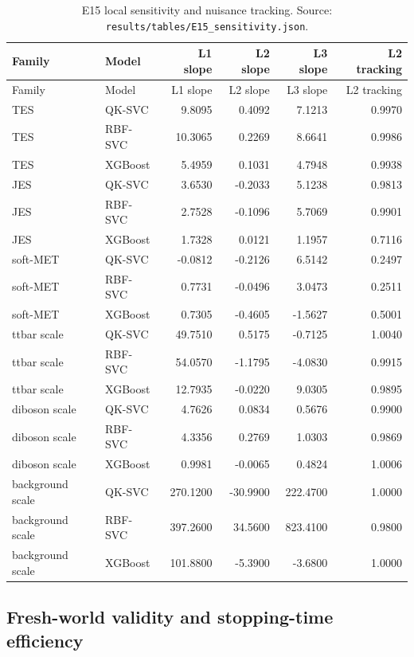 \documentclass[11pt,a4paper]{article}
\begin{document}
\footnotesize
\begin{longtable}{llrrrr}
\caption{E15 local sensitivity and nuisance tracking. Source: \texttt{results/tables/E15\_sensitivity.json}.}\label{tab:e15sens}\\
\toprule
Family & Model & L1 slope & L2 slope & L3 slope & L2 tracking \\
\midrule
\endfirsthead
\toprule
Family & Model & L1 slope & L2 slope & L3 slope & L2 tracking \\
\midrule
\endhead
TES & QK-SVC & 9.8095 & 0.4092 & 7.1213 & 0.9970 \\
TES & RBF-SVC & 10.3065 & 0.2269 & 8.6641 & 0.9986 \\
TES & XGBoost & 5.4959 & 0.1031 & 4.7948 & 0.9938 \\
JES & QK-SVC & 3.6530 & -0.2033 & 5.1238 & 0.9813 \\
JES & RBF-SVC & 2.7528 & -0.1096 & 5.7069 & 0.9901 \\
JES & XGBoost & 1.7328 & 0.0121 & 1.1957 & 0.7116 \\
soft-MET & QK-SVC & -0.0812 & -0.2126 & 6.5142 & 0.2497 \\
soft-MET & RBF-SVC & 0.7731 & -0.0496 & 3.0473 & 0.2511 \\
soft-MET & XGBoost & 0.7305 & -0.4605 & -1.5627 & 0.5001 \\
ttbar scale & QK-SVC & 49.7510 & 0.5175 & -0.7125 & 1.0040 \\
ttbar scale & RBF-SVC & 54.0570 & -1.1795 & -4.0830 & 0.9915 \\
ttbar scale & XGBoost & 12.7935 & -0.0220 & 9.0305 & 0.9895 \\
diboson scale & QK-SVC & 4.7626 & 0.0834 & 0.5676 & 0.9900 \\
diboson scale & RBF-SVC & 4.3356 & 0.2769 & 1.0303 & 0.9869 \\
diboson scale & XGBoost & 0.9981 & -0.0065 & 0.4824 & 1.0006 \\
background scale & QK-SVC & 270.1200 & -30.9900 & 222.4700 & 1.0000 \\
background scale & RBF-SVC & 397.2600 & 34.5600 & 823.4100 & 0.9800 \\
background scale & XGBoost & 101.8800 & -5.3900 & -3.6800 & 1.0000 \\
\bottomrule
\end{longtable}
\normalsize

\subsection{Fresh-world validity and stopping-time efficiency}
\end{document}
